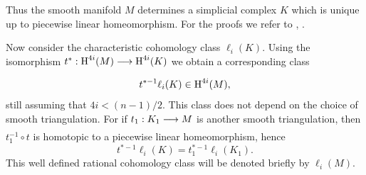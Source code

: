 \documentclass[../main]{subfiles}
\begin{document}
Thus the smooth manifold $M$ determines a simplicial complex $K$ which is unique up to piecewise linear homeomorphism. For the proofs we refer to \cite{whitehead1940}, \cite{munkres1966differential}.

Now consider the characteristic cohomology class $\ell_i(K)$. Using the isomorphism $t^\ast:\homology^{4i}(M) \varrightarrow{} \homology^{4i}(K)$ we obtain a corresponding class \[t^{\ast -1}\ell_i(K) \in \operatorname{H}^{4i}(M),\] still assuming that $4i < (n-1)/2$. This class does not depend on the choice of smooth triangulation. For if $t_1:K_1 \varrightarrow{} M$ is another smooth triangulation, then $t_1^{-1} \circ t$ is homotopic to a piecewise linear homeomorphism, hence \[t^{\ast -1}\ell_i(K) = t_1^{\ast -1}\ell_i(K_1).\] This well defined rational cohomology class will be denoted briefly by $\ell_i(M)$.
\end{document}
